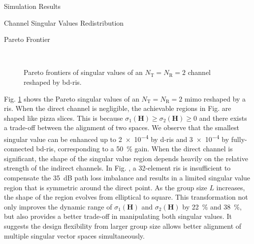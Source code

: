 \documentclass[journal]{IEEEtran}
\begin{document}
\begin{section}{Simulation Results}
\begin{subsection}{Channel Singular Values Redistribution}
\begin{subsubsection}{Pareto Frontier}
\begin{figure}[!t]
{{				 }
			 }
			 \\
			 \caption{Pareto frontiers of singular values of an $N_\mathrm{T}=N_\mathrm{R}=2$ channel reshaped by \gls{bd}-\gls{ris}.}
			 \label{fg:singular_pareto}
		 \end{figure}
		 Fig. \ref{fg:singular_pareto} shows the Pareto singular values of an $N_\mathrm{T}=N_\mathrm{R}=2$ \gls{mimo} reshaped by a \gls{ris}.
		 When the direct channel is negligible, the achievable regions in Fig.  are shaped like pizza slices.
		 This is because $\sigma_1(\mathbf{H}) \ge \sigma_2(\mathbf{H}) \ge 0$ and there exists a trade-off between the alignment of two spaces.
		 We observe that the smallest singular value can be enhanced up to \num{2e-4} by \gls{d}-\gls{ris} and \num{3e-4} by fully-connected \gls{bd}-\gls{ris}, corresponding to a \qty{50}{\percent} gain.
		 When the direct channel is significant, the shape of the singular value region depends heavily on the relative strength of the indirect channels.
		 In Fig. , a 32-element \gls{ris} is insufficient to compensate the \qty{35}{dB} path loss imbalance and results in a limited singular value region that is symmetric around the direct point.
		 As the group size $L$ increases, the shape of the region evolves from elliptical to square.
		 This transformation not only improves the dynamic range of $\sigma_1(\mathbf{H})$ and $\sigma_2(\mathbf{H})$ by \qty{22}{\percent} and \qty{38}{\percent}, but also provides a better trade-off in manipulating both singular values.
		 It suggests the design flexibility from larger group size allows better alignment of multiple singular vector spaces simultaneously.

\end{subsubsection}
\end{subsection}
\end{section}
\end{document}
